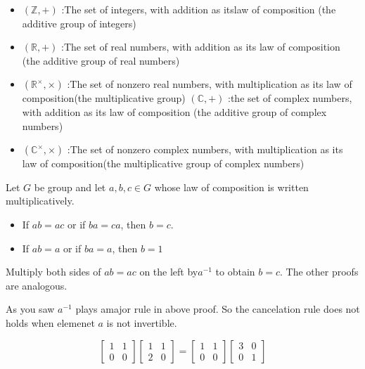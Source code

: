 \documentclass[
]{book}
\providecommand{\tightlist}{%
  \setlength{\itemsep}{0pt}\setlength{\parskip}{0pt}}
\begin{document}
\hypertarget{unnamed-chunk-8}{}
\begin{itemize}
\tightlist
\item
  \((\mathbb{Z},+)\) :The set of integers, with addition as itslaw of
  composition (the additive group of integers)
\item
  \((\mathbb{R},+)\) :The set of real numbers, with addition as its law
  of composition (the additive group of real numbers)
\item
  \((\mathbb{R}^\times,\times)\) :The set of nonzero real numbers, with
  multiplication as its law of composition(the multiplicative group)
  \((\mathbb{C},+)\) :the set of complex numbers, with addition as its
  law of composition (the additive group of complex numbers)
\item
  \((\mathbb{C}^\times,\times)\) :The set of nonzero complex numbers,
  with multiplication as its law of composition(the multiplicative group
  of complex numbers)
\end{itemize}

\leavevmode{}%
Let \(G\) be group and let \(a, b, c \in G\) whose law of composition is
written multiplicatively.

\begin{itemize}
\tightlist
\item
  If \(ab = ac\) or if \(ba = ca\), then \(b = c\).
\item
  If \(a b = a\) or if \(ba = a\), then \(b = 1\)
\end{itemize}

Multiply both sides of \(ab=ac\) on the left by\(a^{-1}\) to obtain
\(b = c\). The other proofs are analogous.

As you saw \(a^{-1}\) plays amajor rule in above proof. So the
cancelation rule does not holds when elemenet \(a\) is not invertible.

\leavevmode{}%
\[\begin{bmatrix} 1 & 1 \\ 0 & 0\end{bmatrix}
\begin{bmatrix} 1 & 1 \\ 2 & 0\end{bmatrix}=
\begin{bmatrix} 1 & 1 \\ 0 & 0\end{bmatrix}
\begin{bmatrix} 3 & 0 \\ 0 & 1\end{bmatrix}\]
\end{document}
